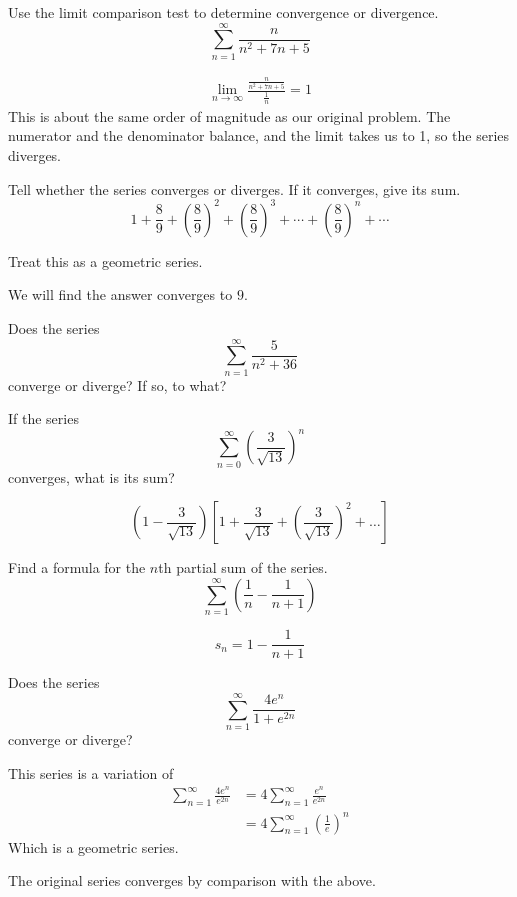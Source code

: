 \begin{ex}
  Use the limit comparison test to determine convergence or divergence.
  \[ \sum^\infty_{n=1} \frac{n}{n^2 + 7n +5} \]
  \begin{sol}
    \begin{align*}
      \lim_{n \to \infty} \frac{\frac{n}{n^2+7n+5}}{\frac{1}{n}} =1
    \end{align*}
    This is about the same order of magnitude as our original problem. The
    numerator and the denominator balance, and the limit takes us to 1, so the
    series diverges.
  \end{sol}
\end{ex}
\begin{ex}
  Tell whether the series converges or diverges. If it converges, give its sum.
  \[ 1 + \frac{8}{9} + \left( \frac{8}{9} \right)^2 + \left(
    \frac{8}{9} \right)^3+ \cdots + \left( \frac{8}{9} \right)^n + \cdots \]
  \begin{sol}
    Treat this as a geometric series.

    We will find the answer converges to $9$.
  \end{sol}
\end{ex}
\begin{ex}
  Does the series
  \[ \sum^\infty_{n=1} \frac{5}{n^2+36} \]
  converge or diverge? If so, to what?
\end{ex}
\begin{ex}
  If the series \[ \sum_{n=0}^\infty \left( \frac{3}{\sqrt{13}} \right)^n \]
  converges, what is its sum?
  \begin{sol}
    \[\left( 1-\frac{3}{\sqrt{13}} \right) \left[ 1+\frac{3}{\sqrt{13}}+\left( \frac{3}{\sqrt{13}} \right)^2+\ldots \right] \]
  \end{sol}
\end{ex}
\begin{ex}
  Find a formula for the \(n\)th partial sum of the series.
  \[ \sum^\infty_{n=1} \left( \frac{1}{n}-\frac{1}{n+1} \right) \]
  \begin{sol}
    \[ s_n = 1-\frac{1}{n+1} \]
  \end{sol}
\end{ex}
\begin{ex}
  Does the series
  \[ \sum^\infty_{n=1} \frac{4e^n}{1+e^{2n}} \]
  converge or diverge?
  \begin{sol}
    This series is a variation of
    \begin{align*}
      \sum^\infty_{n=1} \frac{4e^n}{e^{2n}} &=
      4 \sum^\infty_{n=1} \frac{e^n}{e^{2n}} \\
      &= 4 \sum^\infty_{n=1} \left( \frac{1}{e} \right)^n
    \end{align*}
    Which is a geometric series.

    The original series converges by comparison with the above.
  \end{sol}
\end{ex}
